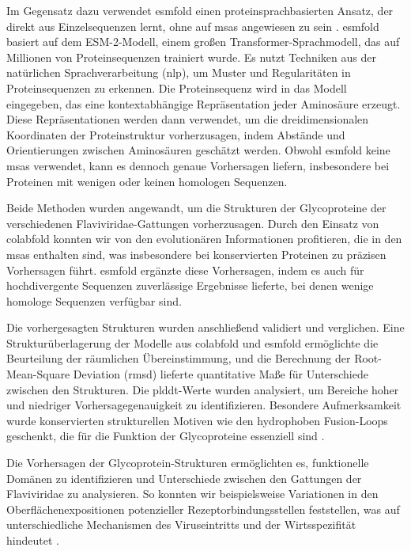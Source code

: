 Im Gegensatz dazu verwendet \gls{esmfold} einen proteinsprachbasierten Ansatz, der direkt aus Einzelsequenzen lernt, ohne auf \glspl{msa} angewiesen zu sein \autocite{linEvolutionaryscalePredictionAtomiclevel2023}. \gls{esmfold} basiert auf dem ESM-2-Modell, einem großen Transformer-Sprachmodell, das auf Millionen von Proteinsequenzen trainiert wurde. Es nutzt Techniken aus der natürlichen Sprachverarbeitung (\gls{nlp}), um Muster und Regularitäten in Proteinsequenzen zu erkennen. Die Proteinsequenz wird in das Modell eingegeben, das eine kontextabhängige Repräsentation jeder Aminosäure erzeugt. Diese Repräsentationen werden dann verwendet, um die dreidimensionalen Koordinaten der Proteinstruktur vorherzusagen, indem Abstände und Orientierungen zwischen Aminosäuren geschätzt werden. Obwohl \gls{esmfold} keine \glspl{msa} verwendet, kann es dennoch genaue Vorhersagen liefern, insbesondere bei Proteinen mit wenigen oder keinen homologen Sequenzen.

Beide Methoden wurden angewandt, um die Strukturen der Glycoproteine der verschiedenen Flaviviridae-Gattungen vorherzusagen. Durch den Einsatz von \gls{colabfold} konnten wir von den evolutionären Informationen profitieren, die in den \glspl{msa} enthalten sind, was insbesondere bei konservierten Proteinen zu präzisen Vorhersagen führt. \gls{esmfold} ergänzte diese Vorhersagen, indem es auch für hochdivergente Sequenzen zuverlässige Ergebnisse lieferte, bei denen wenige homologe Sequenzen verfügbar sind.

Die vorhergesagten Strukturen wurden anschließend validiert und verglichen. Eine Strukturüberlagerung der Modelle aus \gls{colabfold} und \gls{esmfold} ermöglichte die Beurteilung der räumlichen Übereinstimmung, und die Berechnung der Root-Mean-Square Deviation (\gls{rmsd}) lieferte quantitative Maße für Unterschiede zwischen den Strukturen. Die \gls{plddt}-Werte wurden analysiert, um Bereiche hoher und niedriger Vorhersagegenauigkeit zu identifizieren. Besondere Aufmerksamkeit wurde konservierten strukturellen Motiven wie den hydrophoben Fusion-Loops geschenkt, die für die Funktion der Glycoproteine essenziell sind \autocite{Modis2004}.

Die Vorhersagen der Glycoprotein-Strukturen ermöglichten es, funktionelle Domänen zu identifizieren und Unterschiede zwischen den Gattungen der Flaviviridae zu analysieren. So konnten wir beispielsweise Variationen in den Oberflächenexpositionen potenzieller Rezeptorbindungsstellen feststellen, was auf unterschiedliche Mechanismen des Viruseintritts und der Wirtsspezifität hindeutet \autocite{Lavie2017}.

